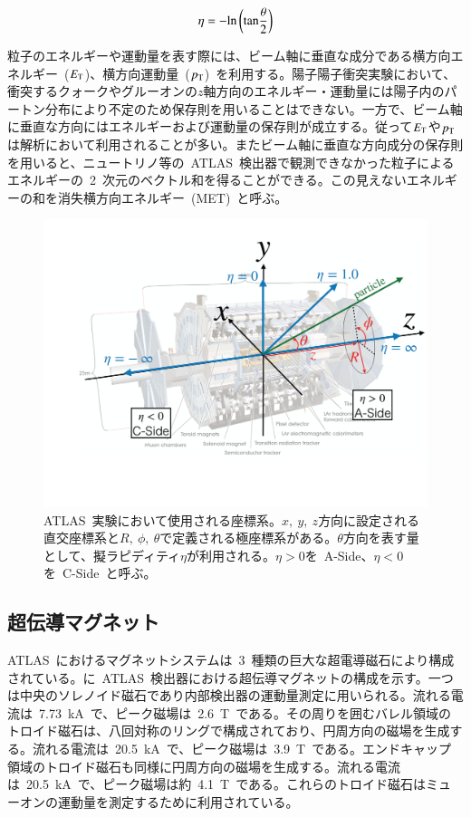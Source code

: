 \begin{align}
    \eta = -\rm{ln}\left(\rm{tan}\frac{\theta}{2}\right) \label{eq:eta}
\end{align}

粒子のエネルギーや運動量を表す際には、ビーム軸に垂直な成分である横方向エネルギー~($E_{\rm{T}}$)、横方向運動量~($p_{\rm{T}}$)~を利用する。陽子陽子衝突実験において、衝突するクォークやグルーオンの$z$軸方向のエネルギー・運動量には陽子内のパートン分布により不定のため保存則を用いることはできない。一方で、ビーム軸に垂直な方向にはエネルギーおよび運動量の保存則が成立する。従って$E_{\rm{T}}$や$p_{\rm{T}}$は解析において利用されることが多い。またビーム軸に垂直な方向成分の保存則を用いると、ニュートリノ等の~ATLAS~検出器で観測できなかった粒子によるエネルギーの~2~次元のベクトル和を得ることができる。この見えないエネルギーの和を消失横方向エネルギー~(MET)~と呼ぶ。

\begin{figure}[tbp]
    \centering  
    \includegraphics[width=\textwidth,page=1]{img/pdf/cood.pdf}
    \caption[ATLAS~実験において使用される座標系]{ATLAS~実験において使用される座標系。$x,~y,~z$方向に設定される直交座標系と$R,~\phi,~\theta$で定義される極座標系がある。$\theta$方向を表す量として、擬ラピディティ$\eta$が利用される。$\eta>0$を~A-Side、$\eta<0$を~C-Side~と呼ぶ。}\label{fig:cood}
\end{figure}

\subsection{超伝導マグネット}
ATLAS~におけるマグネットシステムは~3~種類の巨大な超電導磁石により構成されている。に~ATLAS~検出器における超伝導マグネットの構成を示す。一つは中央のソレノイド磁石であり内部検出器の運動量測定に用いられる。流れる電流は~7.73~kA~で、ピーク磁場は~2.6~T~である。その周りを囲むバレル領域のトロイド磁石は、八回対称のリングで構成されており、円周方向の磁場を生成する。流れる電流は~20.5~kA~で、ピーク磁場は~3.9~T~である。エンドキャップ領域のトロイド磁石も同様に円周方向の磁場を生成する。流れる電流は~20.5~kA~で、ピーク磁場は約~4.1~T~である。これらのトロイド磁石はミューオンの運動量を測定するために利用されている。

